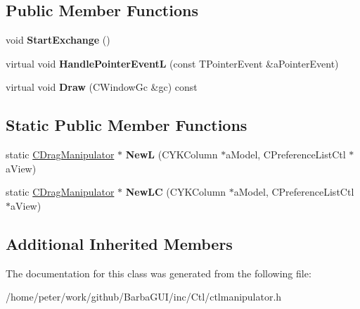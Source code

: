 \subsection*{Public Member Functions}
\begin{DoxyCompactItemize}
\item 
\mbox{\label{classCDragManipulator_a7d2c7d5bb799254782475e4e2e057c0c}} 
void {\bfseries Start\+Exchange} ()
\item 
\mbox{\label{classCDragManipulator_acb55dadea424e7cdb528abbc09431d6a}} 
virtual void {\bfseries Handle\+Pointer\+EventL} (const T\+Pointer\+Event \&a\+Pointer\+Event)
\item 
\mbox{\label{classCDragManipulator_a84a39ea56423e47958b4d4568f6f4b94}} 
virtual void {\bfseries Draw} (C\+Window\+Gc \&gc) const
\end{DoxyCompactItemize}
\subsection*{Static Public Member Functions}
\begin{DoxyCompactItemize}
\item 
\mbox{\label{classCDragManipulator_a6ba4590ac279eada6a7e4e12c1398171}} 
static \hyperlink{classCDragManipulator}{C\+Drag\+Manipulator} $\ast$ {\bfseries NewL} (C\+Y\+K\+Column $\ast$a\+Model, C\+Preference\+List\+Ctl $\ast$a\+View)
\item 
\mbox{\label{classCDragManipulator_acf6b8ce97de139a0673884aa3529eda3}} 
static \hyperlink{classCDragManipulator}{C\+Drag\+Manipulator} $\ast$ {\bfseries New\+LC} (C\+Y\+K\+Column $\ast$a\+Model, C\+Preference\+List\+Ctl $\ast$a\+View)
\end{DoxyCompactItemize}
\subsection*{Additional Inherited Members}


The documentation for this class was generated from the following file\+:\begin{DoxyCompactItemize}
\item 
/home/peter/work/github/\+Barba\+G\+U\+I/inc/\+Ctl/ctlmanipulator.\+h\end{DoxyCompactItemize}
